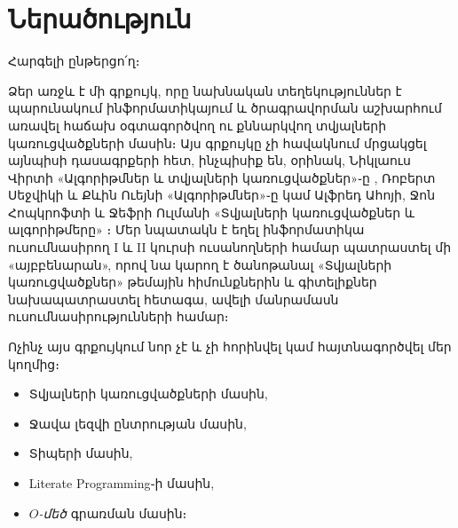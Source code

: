 \chapter{Ներածություն}

Հարգելի ընթերցո՛ղ։

Ձեր առջև է մի գրքույկ, որը նախնական տեղեկություններ է պարունակում
ինֆորմատիկայում և ծրագրավորման աշխարհում առավել հաճախ օգտագործվող ու
քննարկվող տվյալների կառուցվածքների մասին։ Այս գրքույկը չի հավակնում
մրցակցել այնպիսի դասագրքերի հետ, ինչպիսիք են, օրինակ, Նիկլաուս Վիրտի
«Ալգորիթմներ և տվյալների կառուցվածքներ»֊ը \cite{nw-ads}, Ռոբերտ Սեջվիկի
և Քևին Ուեյնի «Ալգորիթմներ»֊ը \cite{rs-kw-al} կամ Ալֆրեդ Ահոյի, Ջոն
Հոպկրոֆտի և Ջեֆրի Ուլմանի «Տվյալների կառուցվածքներ և ալգորիթմերը»
\cite{ahu-dsa}։ Մեր նպատակն է եղել ինֆորմատիկա ուսումնասիրող I և II
կուրսի ուսանողների համար պատրաստել մի «այբբենարան», որով նա կարող է
ծանոթանալ «Տվյալների կառուցվածքներ» թեմային հիմունքներին և գիտելիքներ
նախապատրաստել հետագա, ավելի մանրամասն ուսումնասիրությունների համար։

Ոչինչ այս գրքույկում նոր չէ և չի հորինվել կամ հայտնագործվել մեր կողմից։

\begin{itemize}
  \item Տվյալների կառուցվածքների մասին,
  \item Ջավա լեզվի ընտրության մասին,
  \item Տիպերի մասին,
  \item Literate Programming֊ի մասին,
  \item \(O\)\textit{-մեծ} գրառման մասին։
\end{itemize}
